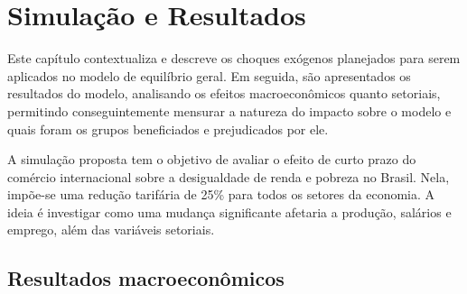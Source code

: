 

\chapter{Simulação e Resultados} \label{cha:resultados}

Este capítulo contextualiza e descreve os choques exógenos planejados para serem aplicados no modelo de equilíbrio geral. Em seguida, são apresentados os resultados do modelo, analisando os efeitos macroeconômicos quanto setoriais, permitindo conseguintemente mensurar a natureza do impacto sobre o modelo e quais foram os grupos beneficiados e prejudicados por ele.

A simulação proposta tem o objetivo de avaliar o efeito de curto prazo do comércio internacional sobre a desigualdade de renda e pobreza no Brasil. Nela, impõe-se uma redução tarifária de 25\% para todos os setores da economia. A ideia é investigar como uma mudança significante afetaria a produção, salários e emprego, além das variáveis setoriais.


\section{Resultados macroeconômicos} \label{sec:resultados_macro}

